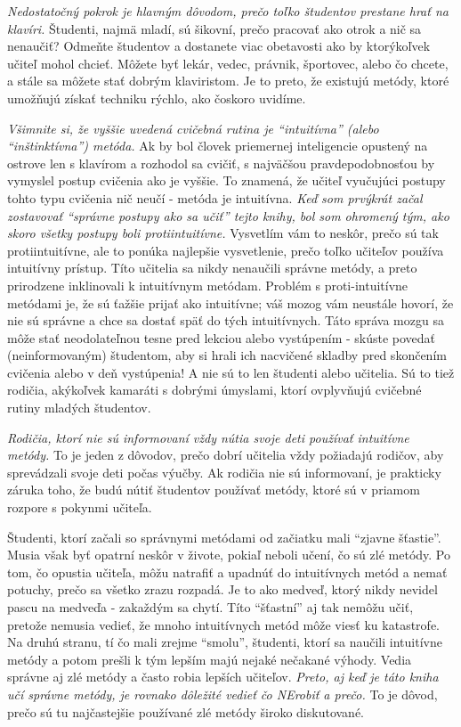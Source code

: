 \emph{Nedostatočný pokrok je hlavným dôvodom, prečo toľko študentov prestane hrať na klavíri.} Študenti, najmä mladí, sú šikovní, prečo pracovať ako otrok a nič sa nenaučiť? Odmeňte študentov a dostanete viac obetavosti ako by ktorýkoľvek učiteľ mohol chcieť. Môžete byť lekár, vedec, právnik, športovec, alebo čo chcete, a stále sa môžete stať dobrým klaviristom. Je to preto, že existujú metódy, ktoré umožňujú získať techniku rýchlo, ako čoskoro uvidíme.

\emph{Všimnite si, že vyššie uvedená cvičebná rutina je “intuitívna” (alebo “inštinktívna”) metóda.} Ak by bol človek priemernej inteligencie opustený na ostrove len s klavírom a rozhodol sa cvičiť, s najväčšou pravdepodobnosťou by vymyslel postup cvičenia ako je vyššie. To znamená, že učiteľ vyučujúci postupy tohto typu cvičenia nič neučí - metóda je intuitívna. \emph{Keď som prvýkrát začal zostavovať “správne postupy ako sa učiť” tejto knihy, bol som ohromený tým, ako skoro všetky postupy boli protiintuitívne.} Vysvetlím vám to neskôr, prečo sú tak protiintuitívne, ale to ponúka najlepšie vysvetlenie, prečo toľko učiteľov používa intuitívny prístup. Títo učitelia sa nikdy nenaučili správne metódy, a preto prirodzene inklinovali k intuitívnym metódam. Problém s proti-intuitívne metódami je, že sú ťažšie prijať ako intuitívne; váš mozog vám neustále hovorí, že nie sú správne a chce sa dostať späť do tých intuitívnych. Táto správa mozgu sa môže stať neodolateľnou  tesne pred lekciou alebo vystúpením - skúste povedať (neinformovaným) študentom, aby si hrali ich nacvičené skladby pred skončením cvičenia alebo v deň vystúpenia! A nie sú to len študenti alebo učitelia. Sú to tiež rodičia, akýkoľvek kamaráti s dobrými úmyslami, ktorí ovplyvňujú cvičebné rutiny mladých študentov.

\emph{Rodičia, ktorí nie sú informovaní vždy nútia svoje deti používať intuitívne metódy.} To je jeden z dôvodov, prečo dobrí učitelia vždy požiadajú rodičov, aby sprevádzali svoje deti počas výučby. Ak rodičia nie sú informovaní, je prakticky záruka toho, že budú nútiť študentov používať metódy, ktoré sú v priamom rozpore s pokynmi učiteľa.


Študenti, ktorí začali so správnymi metódami od začiatku mali “zjavne šťastie”. Musia však byť opatrní neskôr v živote, pokiaľ neboli učení, čo sú zlé metódy. Po tom, čo opustia učiteľa, môžu natrafiť a upadnúť do intuitívnych metód a nemať potuchy, prečo sa všetko zrazu rozpadá. Je to ako medveď, ktorý nikdy nevidel pascu na medveďa - zakaždým sa chytí. Títo “šťastní” aj tak nemôžu učiť, pretože nemusia vedieť, že mnoho intuitívnych metód môže viesť ku katastrofe. Na druhú stranu, tí čo mali zrejme “smolu”, študenti, ktorí sa naučili intuitívne metódy a potom prešli k tým lepším majú nejaké nečakané výhody. Vedia správne aj zlé metódy a často robia lepších učiteľov. \emph{Preto, aj keď je táto kniha učí správne metódy, je rovnako dôležité vedieť čo NErobiť a prečo.} To je dôvod, prečo sú tu najčastejšie používané zlé metódy široko diskutované.

